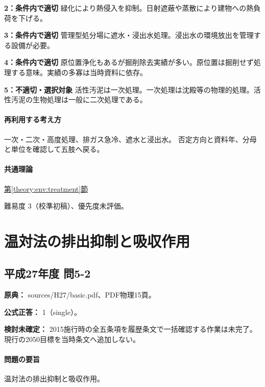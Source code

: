 \noindent\textbf{2：条件内で適切} 緑化により熱侵入を抑制。日射遮蔽や蒸散により建物への熱負荷を下げる。\par

\noindent\textbf{3：条件内で適切} 管理型処分場に遮水・浸出水処理。浸出水の環境放出を管理する設備が必要。\par

\noindent\textbf{4：条件内で適切} 原位置浄化もあるが掘削除去実績が多い。原位置は掘削せず処理する意味。実績の多寡は当時資料に依存。\par

\noindent\textbf{5：不適切・選択対象} 活性汚泥は一次処理。一次処理は沈殿等の物理的処理。活性汚泥の生物処理は一般に二次処理である。\par

\paragraph{再利用する考え方} 一次・二次・高度処理、排ガス急冷、遮水と浸出水。 否定方向と資料年、分母と単位を確認して五肢へ戻る。

\paragraph{共通理論} \hyperref[theory:env:treatment]{第\ref*{theory:env:treatment}節}

\par 難易度 3（校準初稿）、優先度未評価。

\section{温対法の排出抑制と吸収作用}

\subsection{平成27年度 問5-2}
\label{q:h27-reg-basic-5-2}

\noindent\textbf{原典：} sources/H27/basic.pdf、PDF物理15頁。

\textbf{公式正答：} 1（single）。

\par\textbf{検討未確定：} 2015施行時の全五条項を履歴条文で一括確認する作業は未完了。現行の2050目標を当時条文へ追加しない。

\paragraph{問題の要旨} 温対法の排出抑制と吸収作用。

